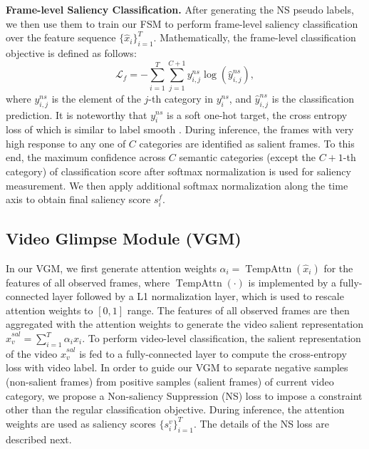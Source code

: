 \documentclass[runningheads]{llncs}
\begin{document}
\noindent \textbf{Frame-level Saliency Classification.}
After generating the NS pseudo labels, we then use them to train our FSM to perform frame-level saliency classification over the feature sequence $\{\hat{x}_i\}_{i=1}^T$. Mathematically, the frame-level classification objective is defined as follows:
\begin{equation}
    \mathcal{L}_{f}={-\sum_{i=1}^{T}\sum_{j=1}^{C+1}y^{ns}_{i,j}} \log(\hat{y}^{ns}_{i,j}),
\end{equation}
where $y_{i,j}^{ns}$ is the element of the $j$-th category in $y_i^{ns}$, and $\hat{y}^{ns}_{i,j}$ is the classification prediction. It is noteworthy that $y_i^{ns}$ is a soft one-hot target, the cross entropy loss of which is similar to label smooth \cite{labelsmooth}.
During inference, the frames with very high response to any one of $C$ categories are identified as salient frames. To this end, the maximum confidence across $C$ semantic categories (except the $C+1$-th category) of classification score after softmax normalization is used for saliency measurement. We then apply additional softmax normalization along the time axis to obtain final saliency score $s^f_i$.

























\subsection{Video Glimpse Module (VGM)}\label{vgmodule}
In our VGM, we first generate attention weights $\alpha_i =  \operatorname{TempAttn}(\hat{x}_i)$ for the features of all observed frames, where $\operatorname{TempAttn}(\cdot)$ is implemented by a fully-connected layer followed by a L1 normalization layer, which is used to rescale attention weights to $[0,1]$ range. The features of all observed frames are then aggregated with the attention weights to generate the video salient representation $\hat{x}_{v}^{sal}=  \sum_{i=1}^T {\alpha}_{i} \hat{x}_i$.
To perform video-level classification, the salient representation of the video $\hat{x}_{v}^{sal}$ is fed to a fully-connected layer to compute the cross-entropy loss with video label. In order to guide our VGM to separate negative samples (non-salient frames) from positive samples (salient frames) of current video category, we propose a Non-saliency Suppression (NS) loss to impose a constraint other than the regular classification objective. During inference, the attention weights are used as saliency scores $\{s^{v}_i\}_{i=1}^T$. The details of the NS loss are described next.
\end{document}
